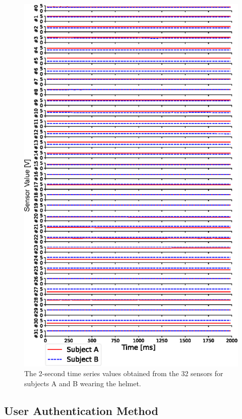 \documentclass[english,preprint,JIP]{ipsj}
\begin{document}
\begin{figure}[!t]
  \centering
    \includegraphics[width=1\linewidth]{figure/sensor_values.eps}
  \caption{The 2-second time series values obtained from the 32 sensors for subjects A and B wearing the helmet.}
  \label{fig:sensor_values}
\end{figure}


\subsection{User Authentication Method}
\end{document}
